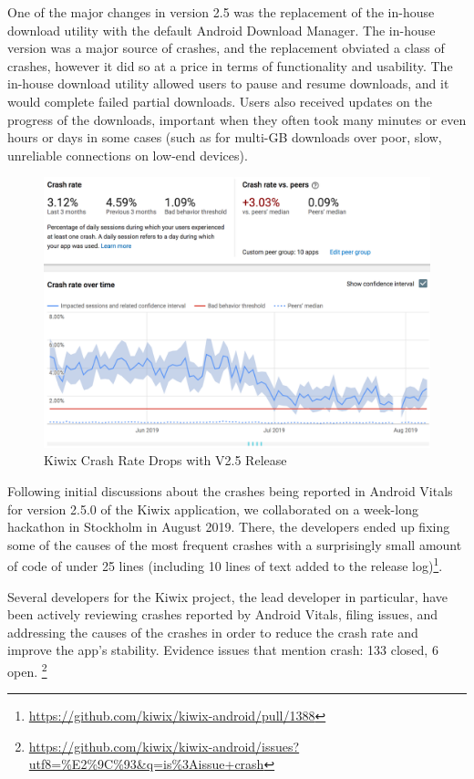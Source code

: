 One of the major changes in version 2.5 was the replacement of the in-house download utility with the default Android Download Manager\cite{kiwix_release_2_5_0}. The in-house version was a major source of crashes, and the replacement obviated a class of crashes, however it did so at a price in terms of functionality and usability. The in-house download utility allowed users to pause and resume downloads, and it would complete failed partial downloads. Users also received updates on the progress of the downloads, important when they often took many minutes or even hours or days in some cases (such as for multi-GB downloads over poor, slow, unreliable connections on low-end devices).
\begin{figure}
    \centering
    \includegraphics[width=\textwidth]{images/android-vitals-screenshots/kiwix-crash-rate-drops-with-v2_5.png}
    \caption{Kiwix Crash Rate Drops with V2.5 Release}
    \label{fig:kiwix_crash_rate_drops_v2_5}
\end{figure}

Following initial discussions about the crashes being reported in Android Vitals for version 2.5.0 of the Kiwix application, we collaborated on a week-long hackathon in Stockholm in August 2019. There, the developers ended up fixing some of the causes of the most frequent crashes with a surprisingly small amount of code of under 25 lines (including 10 lines of text added to the release log)\footnote{\url{https://github.com/kiwix/kiwix-android/pull/1388}}.

Several developers for the Kiwix project, the lead developer in particular, have been actively reviewing crashes reported by Android Vitals, filing issues, and addressing the causes of the crashes in order to reduce the crash rate and improve the app's stability. Evidence issues that mention crash: 133 closed, 6 open. \footnote{\url{https://github.com/kiwix/kiwix-android/issues?utf8=\%E2\%9C\%93&q=is\%3Aissue+crash}}

